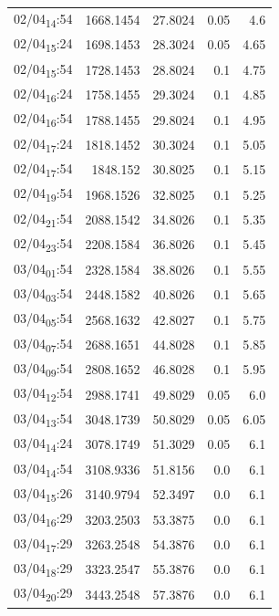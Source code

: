 \documentclass[11pt]{article}
\begin{document}
\begin{center}
\begin{tabular}{lrrrr}
02/04\textsubscript{14}:54 & 1668.1454 & 27.8024 & 0.05 & 4.6\\[0pt]
02/04\textsubscript{15}:24 & 1698.1453 & 28.3024 & 0.05 & 4.65\\[0pt]
02/04\textsubscript{15}:54 & 1728.1453 & 28.8024 & 0.1 & 4.75\\[0pt]
02/04\textsubscript{16}:24 & 1758.1455 & 29.3024 & 0.1 & 4.85\\[0pt]
02/04\textsubscript{16}:54 & 1788.1455 & 29.8024 & 0.1 & 4.95\\[0pt]
02/04\textsubscript{17}:24 & 1818.1452 & 30.3024 & 0.1 & 5.05\\[0pt]
02/04\textsubscript{17}:54 & 1848.152 & 30.8025 & 0.1 & 5.15\\[0pt]
02/04\textsubscript{19}:54 & 1968.1526 & 32.8025 & 0.1 & 5.25\\[0pt]
02/04\textsubscript{21}:54 & 2088.1542 & 34.8026 & 0.1 & 5.35\\[0pt]
02/04\textsubscript{23}:54 & 2208.1584 & 36.8026 & 0.1 & 5.45\\[0pt]
03/04\textsubscript{01}:54 & 2328.1584 & 38.8026 & 0.1 & 5.55\\[0pt]
03/04\textsubscript{03}:54 & 2448.1582 & 40.8026 & 0.1 & 5.65\\[0pt]
03/04\textsubscript{05}:54 & 2568.1632 & 42.8027 & 0.1 & 5.75\\[0pt]
03/04\textsubscript{07}:54 & 2688.1651 & 44.8028 & 0.1 & 5.85\\[0pt]
03/04\textsubscript{09}:54 & 2808.1652 & 46.8028 & 0.1 & 5.95\\[0pt]
03/04\textsubscript{12}:54 & 2988.1741 & 49.8029 & 0.05 & 6.0\\[0pt]
03/04\textsubscript{13}:54 & 3048.1739 & 50.8029 & 0.05 & 6.05\\[0pt]
03/04\textsubscript{14}:24 & 3078.1749 & 51.3029 & 0.05 & 6.1\\[0pt]
03/04\textsubscript{14}:54 & 3108.9336 & 51.8156 & 0.0 & 6.1\\[0pt]
03/04\textsubscript{15}:26 & 3140.9794 & 52.3497 & 0.0 & 6.1\\[0pt]
03/04\textsubscript{16}:29 & 3203.2503 & 53.3875 & 0.0 & 6.1\\[0pt]
03/04\textsubscript{17}:29 & 3263.2548 & 54.3876 & 0.0 & 6.1\\[0pt]
03/04\textsubscript{18}:29 & 3323.2547 & 55.3876 & 0.0 & 6.1\\[0pt]
03/04\textsubscript{20}:29 & 3443.2548 & 57.3876 & 0.0 & 6.1\\[0pt]
\end{tabular}
\end{center}
\end{document}

